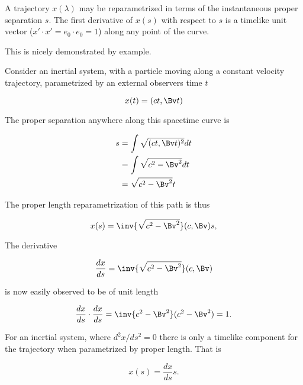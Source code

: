 A trajectory $x(\lambda)$ may be reparametrized in terms of the instantaneous proper separation $s$.  The first derivative of $x(s)$ with respect to $s$ is a timelike unit vector ($x' \cdot x' = e_0 \cdot e_0 = 1$) along any point of the curve.

This is nicely demonstrated by example.

Consider an inertial system, with a particle moving along a constant velocity trajectory, parametrized by an external observers time $t$

\begin{equation}\label{eqn:gramSchmidtLorentz:440}
x(t) = (c t, \Bv t)
\end{equation}

The proper separation anywhere along this spacetime curve is

\begin{equation}\label{eqn:gramSchmidtLorentz:460}
\begin{aligned}
s
&= \int \sqrt{(c t, \Bv t)^2} dt  \\
&= \int \sqrt{ c^2 - \Bv^2 } dt  \\
&= \sqrt{ c^2 - \Bv^2 } t
\end{aligned}
\end{equation}

The proper length reparametrization of this path is thus

\begin{equation}\label{eqn:gramSchmidtLorentz:480}
x(s) = \inv{\sqrt{c^2 - \Bv^2}} (c, \Bv) s,
\end{equation}

The derivative

\begin{equation}\label{eqn:gramSchmidtLorentz:500}
\frac{dx}{ds} = \inv{\sqrt{c^2 - \Bv^2}} (c, \Bv)
\end{equation}

is now easily observed to be of unit length

\begin{equation}\label{eqn:gramSchmidtLorentz:520}
\frac{dx}{ds} \cdot \frac{dx}{ds} 
= \inv{c^2 - \Bv^2} (c^2 - \Bv^2) = 1.
\end{equation}

For an inertial system, where $d^2 x/ds^2 = 0$ there is only a timelike component for the trajectory when parametrized by proper length.  That is

\begin{equation}\label{eqn:gramSchmidtLorentz:580}
x(s) = \frac{dx}{ds} s.
\end{equation}

